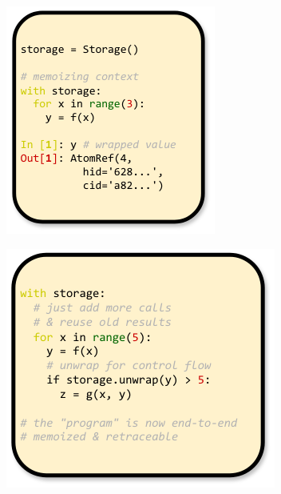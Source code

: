 \documentclass{article} %
\begin{document}
\begin{figure}[h]
\begin{subfigure}{0.35\textwidth}
\includegraphics[width=\textwidth]{img/fig2.pdf}
\end{subfigure}
\begin{subfigure}{0.4\textwidth}
\centering
\includegraphics[width=\textwidth]{img/fig3.pdf}

\end{subfigure}
\end{figure}
\end{document}
